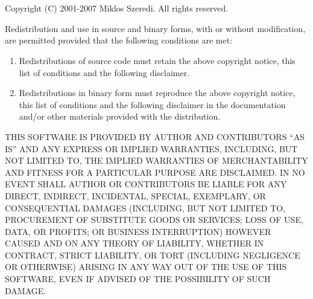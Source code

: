 \chapter{}
\label{app:copyright}


\noindent
Copyright (C) 2001-2007 Miklos Szeredi. All rights reserved.

\vspace{2ex}
\noindent
Redistribution and use in source and binary forms, with or without modification,
are permitted provided that the following conditions are met:
\begin{enumerate}
	\item Redistributions of source code must retain the above copyright notice,
		  this list of conditions and the following disclaimer.
	\item Redistributions in binary form must reproduce the above copyright
		  notice, this list of conditions and the following disclaimer in the
		  documentation and/or other materials provided with the distribution.
\end{enumerate}

\noindent
THIS SOFTWARE IS PROVIDED BY AUTHOR AND CONTRIBUTORS ``AS IS'' AND
ANY EXPRESS OR IMPLIED WARRANTIES, INCLUDING, BUT NOT LIMITED TO, THE
IMPLIED WARRANTIES OF MERCHANTABILITY AND FITNESS FOR A PARTICULAR PURPOSE
ARE DISCLAIMED.  IN NO EVENT SHALL AUTHOR OR CONTRIBUTORS BE LIABLE
FOR ANY DIRECT, INDIRECT, INCIDENTAL, SPECIAL, EXEMPLARY, OR CONSEQUENTIAL
DAMAGES (INCLUDING, BUT NOT LIMITED TO, PROCUREMENT OF SUBSTITUTE GOODS
OR SERVICES; LOSS OF USE, DATA, OR PROFITS; OR BUSINESS INTERRUPTION)
HOWEVER CAUSED AND ON ANY THEORY OF LIABILITY, WHETHER IN CONTRACT, STRICT
LIABILITY, OR TORT (INCLUDING NEGLIGENCE OR OTHERWISE) ARISING IN ANY WAY
OUT OF THE USE OF THIS SOFTWARE, EVEN IF ADVISED OF THE POSSIBILITY OF
SUCH DAMAGE.

